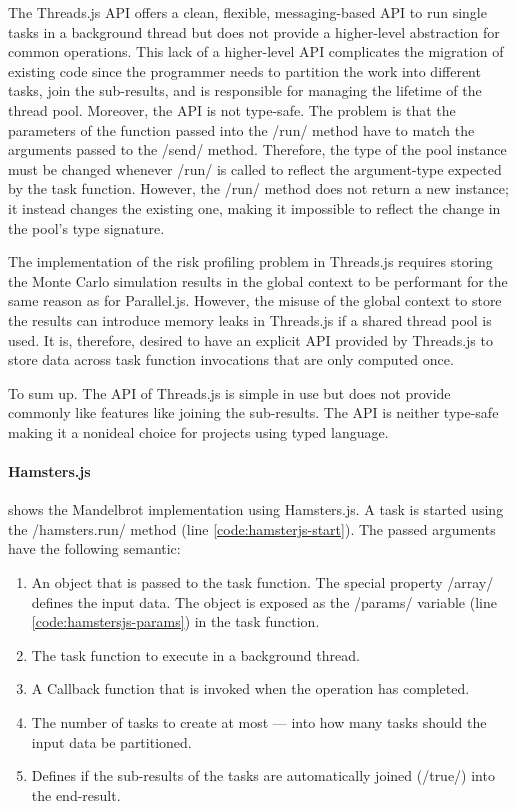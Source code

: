 The Threads.js API offers a clean, flexible, messaging-based API to run single tasks in a background thread but does not provide a higher-level abstraction for common operations. This lack of a higher-level API complicates the migration of existing code since the programmer needs to partition the work into different tasks, join the sub-results, and is responsible for managing the lifetime of the thread pool. Moreover, the API is not type-safe. The problem is that the parameters of the function passed into the \javascriptinline/run/ method have to match the arguments passed to the \javascriptinline/send/ method. Therefore, the type of the pool instance must be changed whenever \javascriptinline/run/ is called to reflect the argument-type expected by the task function. However, the \javascriptinline/run/ method does not return a new instance; it instead changes the existing one, making it impossible to reflect the change in the pool's type signature.

The implementation of the risk profiling problem in Threads.js requires storing the Monte Carlo simulation results in the global context to be performant for the same reason as for Parallel.js. However, the misuse of the global context to store the results can introduce memory leaks in Threads.js if a shared thread pool is used. It is, therefore, desired to have an explicit API provided by Threads.js to store data across task function invocations that are only computed once.

To sum up. The API of Threads.js is simple in use but does not provide commonly like features like joining the sub-results. The API is neither type-safe making it a nonideal choice for projects using typed language.  

\paragraph{Hamsters.js}
 shows the Mandelbrot implementation using Hamsters.js. A task is started using the \javascriptinline/hamsters.run/ method (line \ref{code:hamsterjs-start}). The passed arguments have the following semantic:

\begin{enumerate}
	\item An object that is passed to the task function. The special property \javascriptinline/array/ defines the input data. The object is exposed as the \javascriptinline/params/ variable (line \ref{code:hamstersjs-params}) in the task function.
	\item The task function to execute in a background thread.
	\item A Callback function that is invoked when the operation has completed.
	\item The number of tasks to create at most --- into how many tasks should the input data be partitioned. 
	\item Defines if the sub-results of the tasks are automatically joined (\javascriptinline/true/) into the end-result.
\end{enumerate}

